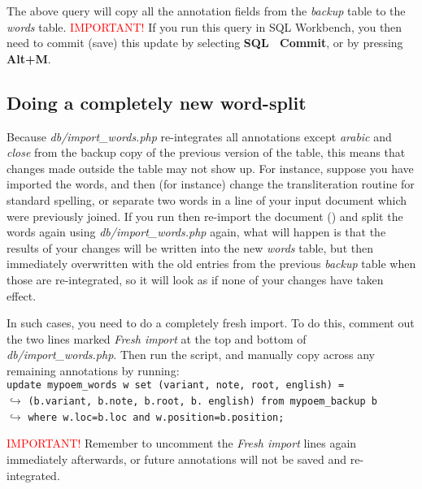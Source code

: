 The above query will copy all the annotation fields from the \textit{backup} table to the \textit{words} table.  \textcolor{red}{IMPORTANT!} If you run this query in SQL Workbench, you then need to commit (save) this update by selecting \textbf{SQL \textrightarrow\ Commit}, or by pressing \textbf{Alt+M}.

\subsection{Doing a completely new word-split}

Because \textit{db/import_words.php} re-integrates all annotations except \textit{arabic} and \textit{close} from the backup copy of the previous version of the table, this means that changes made outside the table may not show up.  For instance, suppose you have imported the words, and then (for instance) change the transliteration routine for standard spelling, or separate two words in a line of your input document which were previously joined.  If you run then re-import the document () and split the words again using \textit{db/import_words.php} again, what will happen is that the results of your changes will be written into the new \textit{words} table, but then immediately overwritten with the old entries from the previous \textit{backup} table when those are re-integrated, so it will look as if none of your changes have taken effect.

In such cases, you need to do a completely fresh import.  To do this, comment out the two lines marked \textit{Fresh import} at the top and bottom of \textit{db/import_words.php}.  Then run the script, and manually copy across any remaining annotations  by running:\\  
\verb|update mypoem_words w set (variant, note, root, english) = |\\
$\hookrightarrow$ \verb|(b.variant, b.note, b.root, b. english) from mypoem_backup b|\\
$\hookrightarrow$ \verb|where w.loc=b.loc and w.position=b.position;|

\textcolor{red}{IMPORTANT!}  Remember to uncomment the \textit{Fresh import} lines again immediately afterwards, or future annotations will not be saved and re-integrated.
